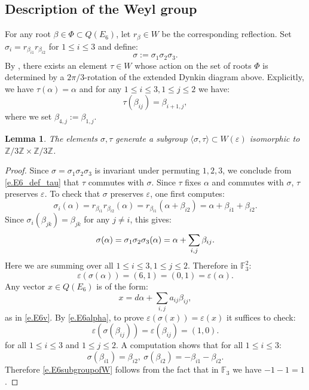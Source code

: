 \documentclass[12pt]{amsart}
\numberwithin{equation}{section}
\newtheorem{lemma}[theorem]{Lemma}
\theoremstyle{definition}
\newcommand{\bF}{\mathbb{F}}
\newcommand{\bZ}{\mathbb{Z}}
\newcommand{\eps}{\varepsilon}
\begin{document}
\subsection*{Description of the Weyl group}
For any root $\beta\in \Phi\subset Q(E_6)$, let $r_\beta\in W$ be the corresponding reflection. Set $\sigma_i = r_{\beta_{i1}}r_{\beta_{i2}}$ for $1\leq i\leq 3$ and define:
$$\sigma := \sigma_1 \sigma_2 \sigma_3.$$
By \cite[Section 4]{chernousov2006another}, there exists an element $\tau\in W$ whose action on the set of roots $\Phi$ is determined by a $2\pi/3$-rotation of the extended Dynkin diagram above. Explicitly, we have $\tau(\alpha) = \alpha$ and for any $1\leq i\leq 3, 1\leq j\leq 2$ we have:
\begin{equation}\label{e.E6_def_tau}
    \tau(\beta_{ij}) = \beta_{i+1,j},
\end{equation}
where we set $\beta_{4,j} := \beta_{1,j}$. 
\begin{lemma}
    The elements $\sigma,\tau$ generate a subgroup $\langle \sigma,\tau\rangle \subset W(\eps)$ isomorphic to $\bZ/3\bZ \times \bZ/3\bZ$. 
\end{lemma}
\begin{proof}
    Since $\sigma = \sigma_1\sigma_2\sigma_3$ is invariant under permuting $1,2,3$, we conclude from \eqref{e.E6_def_tau} that $\tau$ commutes with $\sigma$. Since $\tau$ fixes $\alpha$ and commutes with $\sigma$, $\tau$ preserves $\eps$. To check that $\sigma$ preserves $\eps$, one first computes:
    $$\sigma_i(\alpha) = r_{\beta_{i1}}r_{\beta_{i2}}(\alpha) = r_{\beta_{i1}}(\alpha +\beta_{i2}) =\alpha + \beta_{i1} + \beta_{i2}.$$
    Since $\sigma_i(\beta_{jk}) = \beta_{jk}$ for any $j\neq i$, this gives:
    \begin{equation}\label{e.E6sigmaalpha}
    \sigma(\alpha) = \sigma_1 \sigma_2\sigma_3(\alpha) = \alpha + \sum_{\tiny i,j} \beta_{ij}.
    \end{equation}
    Here we are summing over all $1\leq i\leq 3, 1\leq j \leq 2$. Therefore in $\bF^2_3$:
    \begin{equation}\label{e.E6alpha}
        \eps(\sigma(\alpha))=(6,1) = (0,1) = \eps(\alpha).
    \end{equation} 
    Any vector $x\in Q(E_6)$ is of the form:
    $$ x =  d \alpha + \sum_{i,j} a_{ij}\beta_{ij},$$
    as in \eqref{e.E6v}. By \eqref{e.E6alpha}, to prove $\eps(\sigma(x)) = \eps(x)$ it suffices to check:
    \begin{equation}\label{e.E6subgroupofW}
        \eps(\sigma(\beta_{ij})) = \eps( \beta_{ij})= (1,0).
    \end{equation}
    for all $1\leq i\leq 3$ and $1\leq j\leq 2$. A computation shows that for all $1\leq i\leq 3$: 
    \begin{equation}\label{e.E6sigmabeta}
    \sigma(\beta_{i1}) = \beta_{i2},\  \sigma(\beta_{i2}) = -\beta_{i1}-\beta_{i2}.
    \end{equation}
    Therefore \eqref{e.E6subgroupofW} follows from the fact that in $\bF_3$ we have $-1 -1=1$.
\end{proof}
\end{document}
